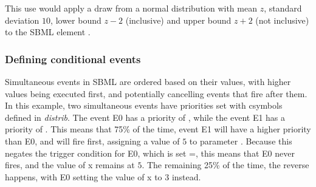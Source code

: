 \documentclass[draftspec]{sbmlpkgspec}
\newcommand{\distribshort}{\emph{distrib}\xspace}
\begin{document}
\begin{blockChanged}
This use would apply a draw from a normal distribution with mean $z$, standard deviation $10$, lower bound $z-2$ (inclusive) and upper bound $z+2$ (not inclusive) to the SBML element .

\subsubsection{Defining conditional events}

Simultaneous events in SBML are ordered based on their \Priority values, with higher values being executed first, and potentially cancelling events that fire after them.  In this example, two simultaneous events have priorities set with csymbols defined in \distribshort.  The event E0 has a priority of , while the event E1 has a priority of .  This means that 75\% of the time, event E1 will have a higher priority than E0, and will fire first, assigning a value of $5$ to parameter .  Because this negates the trigger condition for E0, which is set =, this means that E0 never fires, and the value of x remains at $5$.  The remaining 25\% of the time, the reverse happens, with E0 setting the value of x to $3$ instead.



\end{blockChanged}
\end{document}
